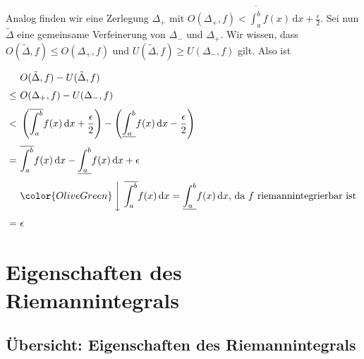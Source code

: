 \documentclass[fontsize=9pt,
               parskip=half-,
               DIV=14,
               listof=chapterentry,
               tocflat]{scrbook}
\newenvironment{indentblock}{\begin{adjustwidth}{.5cm}{}}{\end{adjustwidth}}
\begin{document}
\begin{proof*}
\begin{indentblock}
Analog finden wir eine Zerlegung $\Delta _{+}$ mit $O(\Delta _{+},f)<{\overline {\int _{a}^{b}}}f(x)\,\mathrm {d} x+{\tfrac {\epsilon }{2}}$. Sei nun ${\tilde {\Delta }}$ eine gemeinsame Verfeinerung von $\Delta _{-}$ und $\Delta _{+}$. Wir wissen, dass $O({\tilde {\Delta }},f)\leq O(\Delta _{+},f)$ und $U({\tilde {\Delta }},f)\geq U(\Delta _{-},f)$ gilt. Also ist

\begin{align*}
&O({\tilde {\Delta }},f)-U({\tilde {\Delta }},f)\\[0.3em]\leq \ &O(\Delta _{+},f)-U(\Delta _{-},f)\\[0.3em]<\ &\left({\overline {\int _{a}^{b}}}f(x)\,\mathrm {d} x+{\frac {\epsilon }{2}}\right)-\left({\underline {\int _{a}^{b}}}f(x)\,\mathrm {d} x-{\frac {\epsilon }{2}}\right)\\[0.3em]=\ &{\overline {\int _{a}^{b}}}f(x)\,\mathrm {d} x-{\underline {\int _{a}^{b}}}f(x)\,\mathrm {d} x+\epsilon \\[0.3em]&{\color {OliveGreen}\left\downarrow \ {\overline {\int _{a}^{b}}}f(x)\,\mathrm {d} x={\underline {\int _{a}^{b}}}f(x)\,\mathrm {d} x{\text{, da }}f{\text{ riemannintegrierbar ist}}\right.}\\[0.3em]=\ &\epsilon 
\end{align*}

\end{indentblock}

\end{proof*}

\chapter{Eigenschaften des Riemannintegrals}

\section{Übersicht: Eigenschaften des Riemannintegrals}
\end{document}
